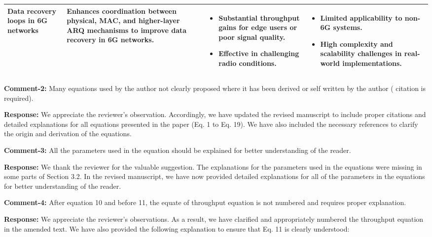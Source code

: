 \documentclass[a4paper,10pt]{article}
\begin{document}
\begin{enumerate}
\begin{longtable}{|>{\centering\arraybackslash}m{3.2cm}|>{\centering\arraybackslash}m{4.3cm}|>{\centering\arraybackslash}m{3.75cm}|>{\centering\arraybackslash}m{3.75cm}|}
\textbf{Data recovery loops in 6G networks} & Enhances coordination between physical, MAC, and higher-layer ARQ mechanisms to improve data recovery in 6G networks. & 
\begin{itemize}
    \item Substantial throughput gains for edge users or poor signal quality.
    \item Effective in challenging radio conditions.
\end{itemize} & 
\begin{itemize}
    \item Limited applicability to non-6G systems.
    \item High complexity and scalability challenges in real-world implementations.
\end{itemize} \\ 
\hline

\end{longtable}


{\color{blue} \item \textbf{Comment-2:} Many equations used by the author not clearly proposed where it has been derived or self written by the author ( citation is required).} 

\textbf{Response:} We appreciate the reviewer’s observation. Accordingly, we have updated the revised manuscript to include proper citations and detailed explanations for all equations presented in the paper (Eq. 1 to Eq. 19). We have also included the necessary references to clarify the origin and derivation of the equations.


{\color{blue} \item \textbf{Comment-3:} All the parameters used in the equation should be explained for better understanding of the reader.}

\textbf{Response:} We thank the reviewer for the valuable suggestion. The explanations for the parameters used in the equations were missing in some parts of Section 3.2. In the revised manuscript, we have now provided detailed explanations for all of the parameters in the equations for better understanding of the reader.


{\color{blue} \item \textbf{Comment-4:} After equation 10 and before 11, the equate of throughput equation is not numbered and requires proper explanation.}

\textbf{Response:} We appreciate the reviewer's observations. As a result, we have clarified and appropriately numbered the throughput equation in the amended text. We have also provided the following explanation to ensure that Eq. 11 is clearly understood:  


\end{enumerate}
\end{document}
